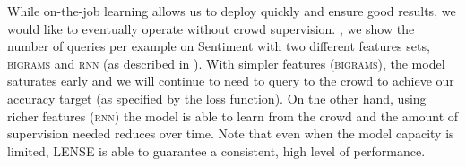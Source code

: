 


While on-the-job learning allows us to deploy quickly and ensure good results, we would like to eventually operate without crowd supervision.
, we show the number of queries per example on Sentiment with two different features sets, \textsc{bigrams} and \textsc{rnn} (as described in ).
With simpler features (\textsc{bigrams}),
the model saturates early and we will continue to need to query to the crowd to achieve our accuracy target (as specified by the loss function).
On the other hand, using richer features (\textsc{rnn}) the model is able to learn from the crowd and the amount of supervision needed reduces over time.
Note that even when the model capacity is limited, LENSE is able to guarantee a consistent, high level of performance.

